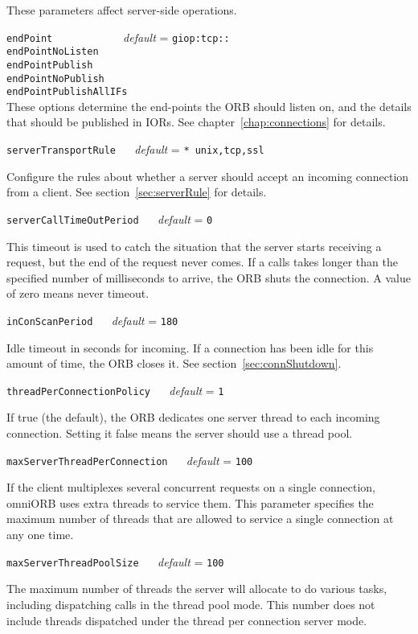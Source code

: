 \documentclass[11pt,twoside,a4paper]{book}
\makeatletter
\newcommand{\code}[1]{\texttt{#1}}
\newcommand{\confopt}[2]
  {\vspace{\baselineskip}\par\noindent\code{#1} ~~ \textit{default} =
   \code{#2}}
\renewcommand{\confopt}[2]
  {\vspace{\baselineskip}\par\noindent\code{#1} ~~ \textit{default} =
   \code{#2}\\[-1ex]\@afterheading}
\makeatother
\begin{document}
These parameters affect server-side operations.


\vspace{\baselineskip}

\noindent
\code{endPoint~~~~~~~~~} ~~ \textit{default} = \code{giop:tcp::}\\
\code{endPointNoListen}\\
\code{endPointPublish}\\
\code{endPointNoPublish}\\
\code{endPointPublishAllIFs}\\[.1ex]

\noindent
These options determine the end-points the ORB should listen on, and
the details that should be published in IORs. See
chapter~\ref{chap:connections} for details.



\confopt{serverTransportRule}{* unix,tcp,ssl}

Configure the rules about whether a server should accept an incoming
connection from a client. See section~\ref{sec:serverRule} for
details.


\confopt{serverCallTimeOutPeriod}{0}

This timeout is used to catch the situation that the server starts
receiving a request, but the end of the request never comes. If a
calls takes longer than the specified number of milliseconds to
arrive, the ORB shuts the connection. A value of zero means never
timeout.


\confopt{inConScanPeriod}{180}

Idle timeout in seconds for incoming. If a connection has been idle
for this amount of time, the ORB closes it. See
section~\ref{sec:connShutdown}.


\confopt{threadPerConnectionPolicy}{1}

If true (the default), the ORB dedicates one server thread to each
incoming connection. Setting it false means the server should use a
thread pool.


\confopt{maxServerThreadPerConnection}{100}

If the client multiplexes several concurrent requests on a single
connection, omniORB uses extra threads to service them. This parameter
specifies the maximum number of threads that are allowed to service a
single connection at any one time.


\confopt{maxServerThreadPoolSize}{100}

The maximum number of threads the server will allocate to do various
tasks, including dispatching calls in the thread pool mode. This
number does not include threads dispatched under the thread per
connection server mode.
\end{document}
